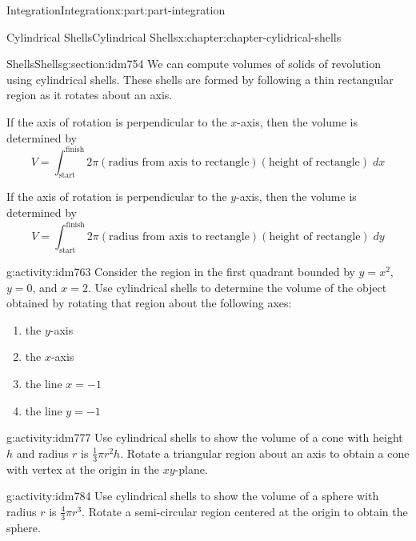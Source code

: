\documentclass[oneside,10pt,]{book}
\numberwithin{equation}{section}
\begin{document}
\begin{partptx}{Integration}{}{Integration}{}{}{x:part:part-integration}
\begin{chapterptx}{Cylindrical Shells}{}{Cylindrical Shells}{}{}{x:chapter:chapter-cylidrical-shells}
\typeout{************************************************}
%
\begin{sectionptx}{Shells}{}{Shells}{}{}{g:section:idm754}
We can compute volumes of solids of revolution using cylindrical shells. These shells are formed by following a thin rectangular region as it rotates about an axis.%
\par
If the axis of rotation is perpendicular to the \(x\)-axis, then the volume is determined by%
\begin{equation*}
V = \int_{\textrm{start}}^{\textrm{finish}} 2\pi (\textrm{radius from axis to rectangle})(\textrm{height of rectangle}) \; dx
\end{equation*}
%
\par
If the axis of rotation is perpendicular to the \(y\)-axis, then the volume is determined by%
\begin{equation*}
V = \int_{\textrm{start}}^{\textrm{finish}} 2\pi (\textrm{radius from axis to rectangle})(\textrm{height of rectangle}) \; dy
\end{equation*}
%
\begin{activity}{}{g:activity:idm763}%
Consider the region in the first quadrant bounded by \(y=x^2\), \(y=0\), and \(x=2\). Use cylindrical shells to determine the volume of the object obtained by rotating that region about the following axes:%
\begin{enumerate}[font=\bfseries,label=(\alph*),ref=\alph*]
\item{}the \(y\)-axis\item{}the \(x\)-axis\item{}the line \(x=-1\)\item{}the line \(y=-1\)\end{enumerate}
\end{activity}
\begin{activity}{}{g:activity:idm777}%
Use cylindrical shells to show the volume of a cone with height \(h\) and radius \(r\) is \(\frac{1}{3}\pi r^2 h\). Rotate a triangular region about an axis to obtain a cone with vertex at the origin in the \(xy\)-plane.%
\end{activity}
\begin{activity}{}{g:activity:idm784}%
Use cylindrical shells to show the volume of a sphere with radius \(r\) is \(\frac{4}{3}\pi r^3\). Rotate a semi-circular region centered at the origin to obtain the sphere.%
\end{activity}
\end{sectionptx}
\end{chapterptx}
\end{partptx}
\end{document}

